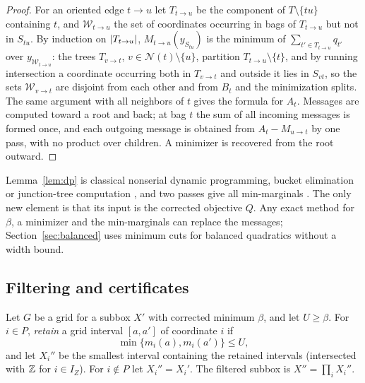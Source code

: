 \begin{proof}
For an oriented edge $t\to u$ let $T_{t\to u}$ be the component of
$T\setminus\{tu\}$ containing $t$, and $\mathcal W_{t\to u}$ the set of
coordinates occurring in bags of $T_{t\to u}$ but not in $S_{tu}$. By
induction on $\lvert T_{t\to u}\rvert$, $M_{t\to u}(y_{S_{tu}})$ is the minimum of
$\sum_{t'\in T_{t\to u}}q_{t'}$ over $y_{\mathcal W_{t\to u}}$: the trees
$T_{v\to t}$, $v\in\mathcal N(t)\setminus\{u\}$, partition
$T_{t\to u}\setminus\{t\}$, and by running intersection a coordinate occurring
both in $T_{v\to t}$ and outside it lies in $S_{vt}$, so the sets
$\mathcal W_{v\to t}$ are disjoint from each other and from $B_t$ and the
minimization splits. The same argument with all neighbors of $t$ gives the
formula for $A_t$. Messages are computed toward a root and back; at bag $t$
the sum of all incoming messages is formed once, and each outgoing message is
obtained from $A_t-M_{u\to t}$ by one pass, with no product over children. A
minimizer is recovered from the root outward.
\end{proof}

Lemma~\ref{lem:dp} is classical nonserial dynamic programming, bucket
elimination or junction-tree computation \cite{BerteleBrioschi1972,Dechter1999,
LauritzenSpiegelhalter1988}, and two passes give all min-marginals
\cite{WainwrightJaakkolaWillsky2005,KohliTorr2006}. The only new element is
that its input is the corrected objective $Q$. Any exact method for $\beta$, a
minimizer and the min-marginals can replace the messages;
Section~\ref{sec:balanced} uses minimum cuts for balanced quadratics without
a width bound.

\subsection{Filtering and certificates}

\begin{definition}\label{def:filter}
Let $G$ be a grid for a subbox $X'$ with corrected minimum $\beta$, and let
$U\ge\beta$. For $i\in P$, \emph{retain} a grid interval $[a,a']$ of
coordinate $i$ if
\begin{equation}\label{eq:retain}
\min\{m_i(a),m_i(a')\}\le U ,
\end{equation}
and let $X_i''$ be the smallest interval containing the retained intervals
(intersected with $\mathbb Z$ for $i\in I_Z$). For $i\notin P$ let $X_i''=X_i'$. The
filtered subbox is $X''=\prod_iX_i''$.
\end{definition}


